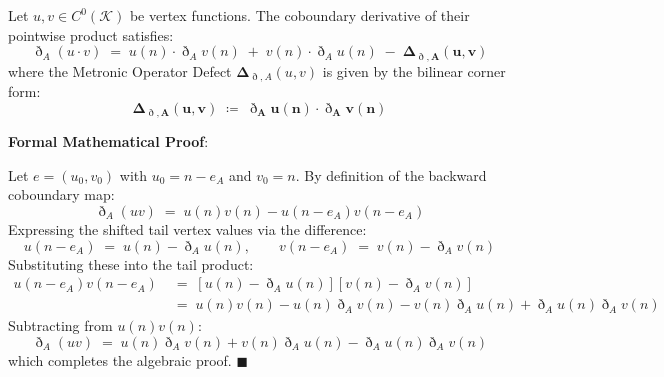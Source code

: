 \documentclass[
    12pt,
    a4paper,
    headings=normal,
    twoside=false,
    open=any,
    parskip=half
]{scrbook}
\newcommand{\ethop}{\eth}
\newenvironment{myproof}[1][]{%
  \par\vspace{6pt}\noindent\textbf{\sffamily\color{maincolor}Formal Mathematical Proof\ifstrempty{#1}{}{ (#1)}}:\par\nopagebreak
}{%
  \penalty50\hfill\ensuremath{\blacksquare}\par\vspace{6pt}
}
\begin{document}
\begin{phystheorem}\label{thm:ch1_exact_non_leibniz_product_rule}
Let $u, v \in C^0(\mathcal{K})$ be vertex functions. The coboundary derivative of their pointwise product satisfies:
\begin{equation}
\boxed{\ethop_A \left( u \cdot v \right) \;=\; u(n) \cdot \ethop_A v(n) \;+\; v(n) \cdot \ethop_A u(n) \;-\; \mathbf{\Delta_{\ethop, A}(u, v)}}
\label{eq:ch1_discrete_product_defect_master}
\end{equation}
where the Metronic Operator Defect $\mathbf{\Delta}_{\ethop, A}(u, v)$ is given by the bilinear corner form:
\begin{equation}
\mathbf{\Delta_{\ethop, A}(u, v) \;\coloneqq\; \ethop_A u(n) \cdot \ethop_A v(n)}
\label{eq:ch1_defect_bilinear_form}
\end{equation}
\end{phystheorem}


\begin{myproof}
Let $e = (u_0, v_0)$ with $u_0 = n - e_A$ and $v_0 = n$. By definition of the backward coboundary map:
\begin{equation*}
\ethop_A(uv) \;=\; u(n)v(n) - u(n - e_A)v(n - e_A)
\end{equation*}
Expressing the shifted tail vertex values via the difference:
\begin{equation*}
u(n - e_A) \;=\; u(n) - \ethop_A u(n), \qquad v(n - e_A) \;=\; v(n) - \ethop_A v(n)
\end{equation*}
Substituting these into the tail product:
\begin{align*}
u(n - e_A)v(n - e_A) &\;=\; \left[ u(n) - \ethop_A u(n) \right] \left[ v(n) - \ethop_A v(n) \right] \\
&\;=\; u(n)v(n) - u(n) \ethop_A v(n) - v(n) \ethop_A u(n) + \ethop_A u(n) \ethop_A v(n)
\end{align*}
Subtracting from $u(n)v(n)$:
\begin{equation*}
\ethop_A(uv) \;=\; u(n)\ethop_A v(n) + v(n)\ethop_A u(n) - \ethop_A u(n)\ethop_A v(n)
\end{equation*}
which completes the algebraic proof.
\end{myproof}
\end{document}
